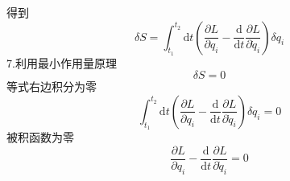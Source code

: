得到
\begin{equation}
    \delta S=\int_{t_1}^{t_2}{\mathrm{d}t}\left( \frac{\partial L}{\partial q_i}-\frac{\mathrm{d}}{\mathrm{d}t}\frac{\partial L}{\partial \dot{q}_i} \right) \delta q_i
\end{equation}
7.利用最小作用量原理
\begin{equation}
    \delta S=0
\end{equation}
等式右边积分为零
\begin{equation}
    \int_{t_1}^{t_2}{\mathrm{d}t}\left( \frac{\partial L}{\partial q_i}-\frac{\mathrm{d}}{\mathrm{d}t}\frac{\partial L}{\partial \dot{q}_i} \right) \delta q_i=0
\end{equation}
被积函数为零
\begin{equation}
    \frac{\partial L}{\partial q_i}-\frac{\mathrm{d}}{\mathrm{d}t}\frac{\partial L}{\partial \dot{q}_i}=0
\end{equation}

\newpage
